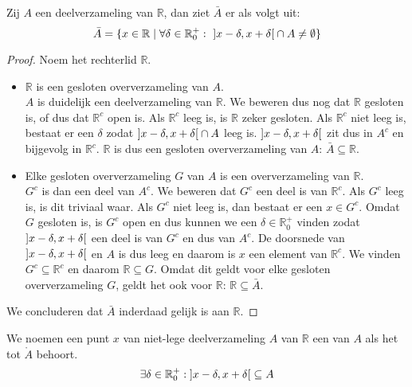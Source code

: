 \documentclass[main.tex]{subfiles}
\begin{document}
\begin{bpr}
  Zij $A$ een deelverzameling van $\mathbb{R}$, dan ziet $\bar{A}$ er als volgt uit:
  \[ \bar{A} = \{ x\in \mathbb{R} \mid \forall \delta \in \mathbb{R}_{0}^{+}:\ \interval[open]{x-\delta}{ x+\delta} \cap A \neq \emptyset \} \]

  \begin{proof}
    Noem het rechterlid $\mathbb{R}$.
    \begin{itemize}
    \item $\mathbb{R}$ is een gesloten oververzameling van $A$.\\
      $A$ is duidelijk een deelverzameling van $\mathbb{R}$.
      We beweren dus nog dat $\mathbb{R}$ gesloten is, of dus dat $\mathbb{R}^{c}$ open is.
      Als $\mathbb{R}^{c}$ leeg is, is $\mathbb{R}$ zeker gesloten.
      Als $\mathbb{R}^{c}$ niet leeg is, bestaat er een $\delta$ zodat $\interval[open]{x-\delta}{x+\delta} \cap A$ leeg is.
      $\interval[open]{x-\delta}{x+\delta}$ zit dus in $A^{c}$ en bijgevolg in $\mathbb{R}^{c}$.\waarom
      $\mathbb{R}$ is dus een gesloten oververzameling van $A$: $\bar{A} \subseteq \mathbb{R}$.
    \item Elke gesloten oververzameling $G$ van $A$ is een oververzameling van $\mathbb{R}$.\\
      $G^{c}$ is dan een deel van $A^{c}$.
      We beweren dat $G^{c}$ een deel is van $\mathbb{R}^{c}$.
      Als $G^{c}$ leeg is, is dit triviaal waar.
      Als $G^{c}$ niet leeg is, dan bestaat er een $x\in G^{c}$.
      Omdat $G$ gesloten is, is $G^{c}$ open en dus kunnen we een $\delta \in \mathbb{R}_{0}^{+}$ vinden zodat $\interval[open]{x-\delta}{x+\delta}$ een deel is van $G^{c}$ en dus van $A^{c}$.
      De doorsnede van $\interval[open]{x-\delta}{x+\delta}$ en $A$ is dus leeg en daarom is $x$ een element van $\mathbb{R}^{c}$.
      We vinden $G^{c}\subseteq \mathbb{R}^{c}$ en daarom $\mathbb{R} \subseteq G$.
      Omdat dit geldt voor elke gesloten oververzameling $G$, geldt het ook voor $\mathbb{R}$: $\mathbb{R} \subseteq \bar{A}$.
    \end{itemize}
    We concluderen dat $\bar{A}$ inderdaad gelijk is aan $\mathbb{R}$.
  \end{proof}
\end{bpr}

\begin{de}
  We noemen een punt $x$ van niet-lege deelverzameling $A$ van $\mathbb{R}$ een  van $A$ als het tot $\mathring{A}$ behoort.
  \[ \exists \delta \in \mathbb{R}_{0}^{+}: \interval[open]{x-\delta}{x+\delta} \subseteq A \]
\end{de}
\end{document}
